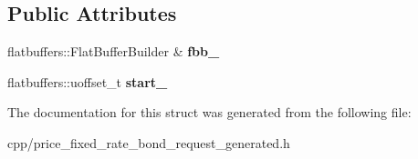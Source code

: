 \subsection*{Public Attributes}
\begin{DoxyCompactItemize}
\item 
\mbox{\label{structquantra_1_1PriceFixedRateBondRequestBuilder_a04160aa757ba862fb7e084d32f14b135}} 
flatbuffers\+::\+Flat\+Buffer\+Builder \& {\bfseries fbb\+\_\+}
\item 
\mbox{\label{structquantra_1_1PriceFixedRateBondRequestBuilder_a4ef4efbbf26aebe96e67e2a5d121e4e0}} 
flatbuffers\+::uoffset\+\_\+t {\bfseries start\+\_\+}
\end{DoxyCompactItemize}


The documentation for this struct was generated from the following file\+:\begin{DoxyCompactItemize}
\item 
cpp/price\+\_\+fixed\+\_\+rate\+\_\+bond\+\_\+request\+\_\+generated.\+h\end{DoxyCompactItemize}
